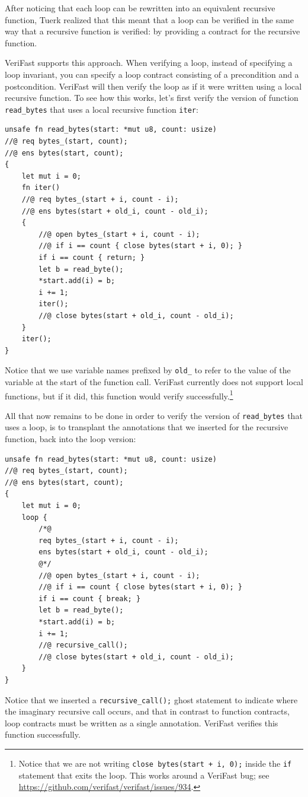 \documentclass{article}
\begin{document}
After noticing that each loop can be rewritten into an equivalent recursive function, Tuerk realized that this meant that a loop can be verified
in the same way that a recursive function is verified: by providing a contract for the recursive function.

VeriFast supports this approach. When verifying a loop, instead of specifying a loop invariant, you can specify a loop contract consisting of a
precondition and a postcondition. VeriFast will then verify the loop as if it were written using a local recursive function. To see how this works, let's
first verify the version of function \lstinline!read_bytes! that uses a local recursive function \lstinline!iter!:
\begin{lstlisting}
unsafe fn read_bytes(start: *mut u8, count: usize)
//@ req bytes_(start, count);
//@ ens bytes(start, count);
{
    let mut i = 0;
    fn iter()
    //@ req bytes_(start + i, count - i);
    //@ ens bytes(start + old_i, count - old_i);
    {
        //@ open bytes_(start + i, count - i);
        //@ if i == count { close bytes(start + i, 0); }
        if i == count { return; }
        let b = read_byte();
        *start.add(i) = b;
        i += 1;
        iter();
        //@ close bytes(start + old_i, count - old_i);
    }
    iter();
}
\end{lstlisting}
Notice that we use variable names prefixed by \lstinline!old_! to refer to the value of the variable at the start of the function call.
VeriFast currently does not support local functions, but if it did, this function would verify successfully.\footnote{Notice that we are not writing \lstinline|close bytes(start + i, 0);| inside the \lstinline|if| statement that exits the loop. This works around a VeriFast bug; see \url{https://github.com/verifast/verifast/issues/934}.}

All that now remains to be done in order to verify the version of \lstinline!read_bytes! that uses a loop, is to transplant the
annotations that we inserted for the recursive function, back into the loop version:
\begin{lstlisting}
unsafe fn read_bytes(start: *mut u8, count: usize)
//@ req bytes_(start, count);
//@ ens bytes(start, count);
{
    let mut i = 0;
    loop {
        /*@
        req bytes_(start + i, count - i);
        ens bytes(start + old_i, count - old_i);
        @*/
        //@ open bytes_(start + i, count - i);
        //@ if i == count { close bytes(start + i, 0); }
        if i == count { break; }
        let b = read_byte();
        *start.add(i) = b;
        i += 1;
        //@ recursive_call();
        //@ close bytes(start + old_i, count - old_i);
    }
}
\end{lstlisting}
Notice that we inserted a \lstinline!recursive_call();! ghost statement to indicate where the imaginary recursive call occurs, and that in contrast to function contracts, loop contracts must be written as a single annotation. VeriFast verifies
this function successfully.
\end{document}
